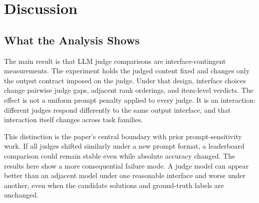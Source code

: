 \documentclass[journal]{IEEEtran}
\begin{document}
\begin{table}[t]
\centering
\footnotesize
\setlength{\tabcolsep}{3pt}
\caption{Subjective no-gold RewardBench diagnostic from ifc\_subjective\_control.csv. Interface flips are preference changes across five pairwise output interfaces on fixed A/B pairs. Position flips are estimated from order-swapped controls on choice-only and feedback-then-choice. Beyond position is the difference between the two. Chosen range is the max-min range in agreement with the curated chosen side across interfaces, reported as secondary preference-alignment evidence rather than deterministic accuracy. Values are percentages or percentage points.}
\label{tab:subjective-control}
\end{table}


\section{Discussion}
\label{sec:discussion}

\subsection{What the Analysis Shows}
\label{sec:discussion-shows}

The main result is that LLM judge comparisons are interface-contingent measurements. The experiment holds the judged content fixed and changes only the output contract imposed on the judge. Under that design, interface choices change pairwise judge gaps, adjacent rank orderings, and item-level verdicts. The effect is not a uniform prompt penalty applied to every judge. It is an interaction: different judges respond differently to the same output interface, and that interaction itself changes across task families.

This distinction is the paper's central boundary with prior prompt-sensitivity work. If all judges shifted similarly under a new prompt format, a leaderboard comparison could remain stable even while absolute accuracy changed. The results here show a more consequential failure mode. A judge model can appear better than an adjacent model under one reasonable interface and worse under another, even when the candidate solutions and ground-truth labels are unchanged.
\end{document}
